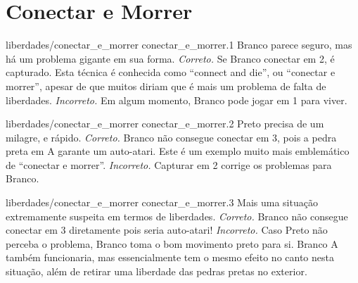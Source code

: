 \chapter{Conectar e Morrer}

\emptypage

\problemAnswerDiagram
  {liberdades/conectar_e_morrer}
  {conectar_e_morrer.1}
  {Branco parece seguro, mas há um problema gigante em sua forma.}
  {\emph{Correto.} Se Branco conectar em 2, é capturado. Esta técnica é conhecida como ``connect and die'', ou ``conectar e morrer'', apesar de que muitos diriam que é mais um problema de falta de liberdades.}
  {\emph{Incorreto.} Em algum momento, Branco pode jogar em 1 para viver.}

\problemAnswerDiagram
  {liberdades/conectar_e_morrer}
  {conectar_e_morrer.2}
  {Preto precisa de um milagre, e rápido.}
  {\emph{Correto.} Branco não consegue conectar em 3, pois a pedra preta em A garante um auto-atari. Este é um exemplo muito mais emblemático de ``conectar e morrer''.}
  {\emph{Incorreto.} Capturar em 2 corrige os problemas para Branco.}

\problemAnswerDiagram
  {liberdades/conectar_e_morrer}
  {conectar_e_morrer.3}
  {Mais uma situação extremamente suspeita em termos de liberdades.}
  {\emph{Correto.} Branco não consegue conectar em 3 diretamente pois seria auto-atari!}
  {\emph{Incorreto.} Caso Preto não perceba o problema, Branco toma o bom movimento preto para si. Branco A também funcionaria, mas essencialmente tem o mesmo efeito no canto nesta situação, além de retirar uma liberdade das pedras pretas no exterior.}

\clearedpage
\clearedpage
